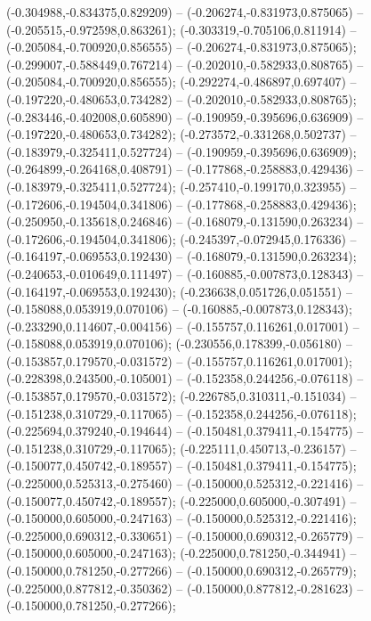  (-0.304988,-0.834375,0.829209) -- (-0.206274,-0.831973,0.875065) -- (-0.205515,-0.972598,0.863261);
 (-0.303319,-0.705106,0.811914) -- (-0.205084,-0.700920,0.856555) -- (-0.206274,-0.831973,0.875065);
 (-0.299007,-0.588449,0.767214) -- (-0.202010,-0.582933,0.808765) -- (-0.205084,-0.700920,0.856555);
 (-0.292274,-0.486897,0.697407) -- (-0.197220,-0.480653,0.734282) -- (-0.202010,-0.582933,0.808765);
 (-0.283446,-0.402008,0.605890) -- (-0.190959,-0.395696,0.636909) -- (-0.197220,-0.480653,0.734282);
 (-0.273572,-0.331268,0.502737) -- (-0.183979,-0.325411,0.527724) -- (-0.190959,-0.395696,0.636909);
 (-0.264899,-0.264168,0.408791) -- (-0.177868,-0.258883,0.429436) -- (-0.183979,-0.325411,0.527724);
 (-0.257410,-0.199170,0.323955) -- (-0.172606,-0.194504,0.341806) -- (-0.177868,-0.258883,0.429436);
 (-0.250950,-0.135618,0.246846) -- (-0.168079,-0.131590,0.263234) -- (-0.172606,-0.194504,0.341806);
 (-0.245397,-0.072945,0.176336) -- (-0.164197,-0.069553,0.192430) -- (-0.168079,-0.131590,0.263234);
 (-0.240653,-0.010649,0.111497) -- (-0.160885,-0.007873,0.128343) -- (-0.164197,-0.069553,0.192430);
 (-0.236638,0.051726,0.051551) -- (-0.158088,0.053919,0.070106) -- (-0.160885,-0.007873,0.128343);
 (-0.233290,0.114607,-0.004156) -- (-0.155757,0.116261,0.017001) -- (-0.158088,0.053919,0.070106);
 (-0.230556,0.178399,-0.056180) -- (-0.153857,0.179570,-0.031572) -- (-0.155757,0.116261,0.017001);
 (-0.228398,0.243500,-0.105001) -- (-0.152358,0.244256,-0.076118) -- (-0.153857,0.179570,-0.031572);
 (-0.226785,0.310311,-0.151034) -- (-0.151238,0.310729,-0.117065) -- (-0.152358,0.244256,-0.076118);
 (-0.225694,0.379240,-0.194644) -- (-0.150481,0.379411,-0.154775) -- (-0.151238,0.310729,-0.117065);
 (-0.225111,0.450713,-0.236157) -- (-0.150077,0.450742,-0.189557) -- (-0.150481,0.379411,-0.154775);
 (-0.225000,0.525313,-0.275460) -- (-0.150000,0.525312,-0.221416) -- (-0.150077,0.450742,-0.189557);
 (-0.225000,0.605000,-0.307491) -- (-0.150000,0.605000,-0.247163) -- (-0.150000,0.525312,-0.221416);
 (-0.225000,0.690312,-0.330651) -- (-0.150000,0.690312,-0.265779) -- (-0.150000,0.605000,-0.247163);
 (-0.225000,0.781250,-0.344941) -- (-0.150000,0.781250,-0.277266) -- (-0.150000,0.690312,-0.265779);
 (-0.225000,0.877812,-0.350362) -- (-0.150000,0.877812,-0.281623) -- (-0.150000,0.781250,-0.277266);
